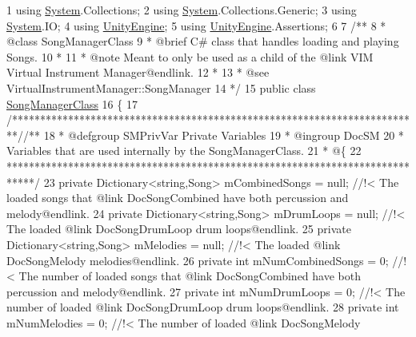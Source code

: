 \begin{DoxyCodeInclude}
1 \textcolor{keyword}{using} \hyperlink{namespace_system}{System}.Collections;
2 \textcolor{keyword}{using} \hyperlink{namespace_system}{System}.Collections.Generic;
3 \textcolor{keyword}{using} \hyperlink{namespace_system}{System}.IO;
4 \textcolor{keyword}{using} \hyperlink{namespace_unity_engine}{UnityEngine};
5 \textcolor{keyword}{using} \hyperlink{namespace_unity_engine}{UnityEngine}.Assertions;
6 \textcolor{comment}{}
7 \textcolor{comment}{/**}
8 \textcolor{comment}{ * @class SongManagerClass}
9 \textcolor{comment}{ * @brief C# class that handles loading and playing Songs. }
10 \textcolor{comment}{ * }
11 \textcolor{comment}{ * @note Meant to only be used as a child of the @link VIM Virtual Instrument Manager@endlink.}
12 \textcolor{comment}{ * }
13 \textcolor{comment}{ * @see VirtualInstrumentManager::SongManager}
14 \textcolor{comment}{*/}
15 \textcolor{keyword}{public} \textcolor{keyword}{class }\hyperlink{class_song_manager_class}{SongManagerClass} 
16 \{
17     \textcolor{comment}{/*************************************************************************/}\textcolor{comment}{/** }
18 \textcolor{comment}{     * @defgroup SMPrivVar Private Variables}
19 \textcolor{comment}{     * @ingroup DocSM}
20 \textcolor{comment}{     * Variables that are used internally by the SongManagerClass.}
21 \textcolor{comment}{     * @\{}
22 \textcolor{comment}{    *****************************************************************************/}
23     \textcolor{keyword}{private} Dictionary<string,Song>    mCombinedSongs = null; \textcolor{comment}{//!< The loaded songs that @link
       DocSongCombined have both percussion and melody@endlink.}
24 \textcolor{comment}{}    \textcolor{keyword}{private} Dictionary<string,Song>    mDrumLoops = null; \textcolor{comment}{//!< The loaded @link DocSongDrumLoop drum
       loops@endlink.}
25 \textcolor{comment}{}    \textcolor{keyword}{private} Dictionary<string,Song>    mMelodies = null; \textcolor{comment}{//!< The loaded @link DocSongMelody
       melodies@endlink.}
26 \textcolor{comment}{}    \textcolor{keyword}{private} \textcolor{keywordtype}{int}                        mNumCombinedSongs = 0; \textcolor{comment}{//!< The number of loaded songs that @link
       DocSongCombined have both percussion and melody@endlink.}
27 \textcolor{comment}{}    \textcolor{keyword}{private} \textcolor{keywordtype}{int}                        mNumDrumLoops = 0; \textcolor{comment}{//!< The number of loaded @link DocSongDrumLoop
       drum loops@endlink.}
28 \textcolor{comment}{}    \textcolor{keyword}{private} \textcolor{keywordtype}{int}                        mNumMelodies = 0; \textcolor{comment}{//!< The number of loaded @link DocSongMelody
}
\end{DoxyCodeInclude}
